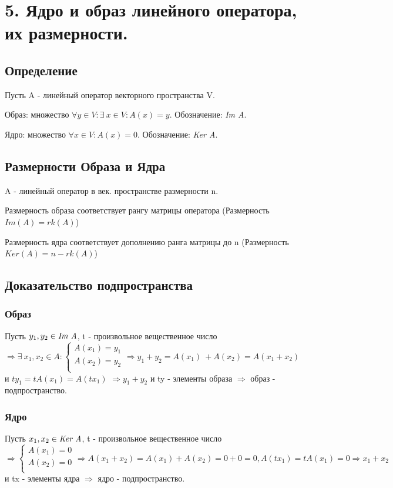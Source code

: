\documentclass[12pt]{article}
\begin{document}
\section{5. Ядро и образ линейного оператора, их размерности.}
\subsection{Определение}
Пусть A - линейный оператор векторного пространства V.

Образ: множество $\forall y \in V : \exists\ x \in V : A(x) = y$. Обозначение: \emph{Im A}.

Ядро: множество $\forall x \in V : A(x) = 0$. Обозначение: \emph{Ker A}.

\subsection{Размерности Образа и Ядра}
A - линейный оператор в век. пространстве размерности n.

Размерность образа соответствует рангу матрицы оператора (Размерность $Im(A) = rk(A)$)

Размерность ядра соответствует дополнению ранга матрицы до n (Размерность $Ker(A) = n - rk(A)$)

\subsection{Доказательство подпространства}

\subsubsection{Образ}
Пусть $y_1, y_2 \in \emph{Im A}$, t - произвольное вещественное число $\Rightarrow \exists\ x_1, x_2 \in A : \begin{cases}
        A(x_1) = y_1 \\
        A(x_2) = y_2 \\
    \end{cases}
    \Rightarrow y_1 + y_2 = A(x_1)\ + A(x_2) = A(x_1 + x_2)$ и $ty_1 = tA(x_1) = A(tx_1)$ $\Rightarrow y_1 + y_2$ и ty - элементы образа $\Rightarrow$ образ - подпространство.

\subsubsection{Ядро}
Пусть $x_1, x_2 \in \emph{Ker A}$, t - произвольное вещественное число $\Rightarrow \begin{cases}
        A(x_1) = 0 \\
        A(x_2) = 0 \\
    \end{cases}
    \Rightarrow A(x_1+x_2) = A(x_1) + A(x_2) = 0 + 0 = 0, A(tx_1) = tA(x_1) = 0 \Rightarrow x_1 + x_2$ и tx - элементы ядра $\Rightarrow$ ядро - подпространство.
\end{document}

